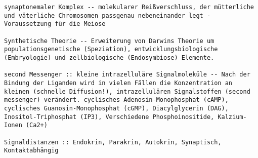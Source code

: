 \documentclass{article}
\begin{document}
\begin{verbatim}
synaptonemaler Komplex -- molekularer Reißverschluss, der mütterliche und väterliche Chromosomen passgenau nebeneinander legt - Voraussetzung für die Meiose

Synthetische Theorie -- Erweiterung von Darwins Theorie um populationsgenetische (Speziation), entwicklungsbiologische (Embryologie) und zellbiologische (Endosymbiose) Elemente.

second Messenger :: kleine intrazelluläre Signalmoleküle -- Nach der Bindung der Liganden wird in vielen Fällen die Konzentration an kleinen (schnelle Diffusion!), intrazellulären Signalstoffen (second messenger) verändert. cyclisches Adenosin-Monophosphat (cAMP), cyclisches Guanosin-Monophosphat (cGMP), Diacylglycerin (DAG), Inositol-Triphosphat (IP3), Verschiedene Phosphoinositide, Kalzium-Ionen (Ca2+)

Signaldistanzen :: Endokrin, Parakrin, Autokrin, Synaptisch, Kontaktabhängig

\end{verbatim}
\newpage
\end{document}
